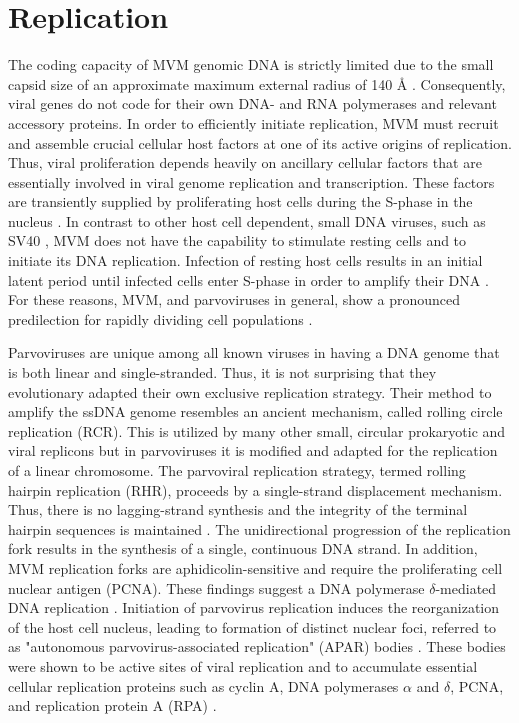 \section{Replication}
\label{Replication}
The coding capacity of MVM genomic DNA is strictly limited due to the small capsid size of an approximate maximum external radius of 140 \r{A} \cite{pmid15299974}. Consequently, viral genes do not code for their own DNA- and RNA polymerases and relevant accessory proteins. In order to efficiently initiate replication, MVM must recruit and assemble crucial cellular host factors at one of its active origins of replication. Thus, viral proliferation depends heavily on ancillary cellular factors that are essentially involved in viral genome replication and transcription. These factors are transiently supplied by proliferating host cells during the S-phase in the nucleus \cite{pmid16789120, pmid6602221, pmid3005655, pmid3296697, pmid9418888, pmid4673484, S-phase}. In contrast to other host cell dependent, small DNA viruses, such as SV40 \cite{pmid4291013, pmid16578647}, MVM does not have the capability to stimulate resting cells and to initiate its DNA replication. Infection of resting host cells results in an initial latent period until infected cells enter S-phase in order to amplify their DNA \cite{pmid4673484, pmid3346950, pmid10792046}. For these reasons, MVM, and parvoviruses in general, show a pronounced predilection for rapidly dividing cell populations \cite{pmid3296697}. 

Parvoviruses are unique among all known viruses in having a DNA genome that is both linear and single-stranded. Thus, it is not surprising that they evolutionary adapted their own exclusive replication strategy. Their method to amplify the ssDNA genome resembles an ancient mechanism, called rolling circle replication (RCR). This is utilized by many other small, circular prokaryotic and viral replicons \cite{pmid1630899, pmid8374079, pmid8824773, pmid9092519, pmid9010307} but in parvoviruses it is modified and adapted for the replication of a linear chromosome. The parvoviral replication strategy, termed rolling hairpin replication (RHR), proceeds by a single-strand displacement mechanism. Thus, there is no lagging-strand synthesis and the integrity of the terminal hairpin sequences is maintained \cite{pmid967244}. The unidirectional progression of the replication fork results in the synthesis of a single, continuous DNA strand. In addition, MVM replication forks are aphidicolin-sensitive and require the proliferating cell nuclear antigen (PCNA). These findings suggest a DNA polymerase $\delta$-mediated DNA replication \cite{pmid10792046, pmid12050365, pmid9525597}. Initiation of parvovirus replication induces the reorganization of the host cell nucleus, leading to formation of distinct nuclear foci, referred to as "autonomous parvovirus-associated replication" (APAR) bodies \cite{pmid11287588, pmid10775619, pmid11907229}. These bodies were shown to be active sites of viral replication and to accumulate essential cellular replication proteins such as cyclin A, DNA polymerases $\alpha$ and $\delta$, PCNA, and replication protein A (RPA) \cite{pmid10792046}. 

